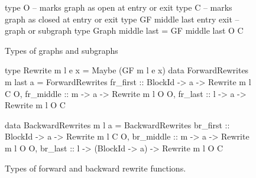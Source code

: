 \documentclass[blockstyle,preprint,natbib,nocopyrightspace]{sigplanconf}
\newcommand\figlabel[1]{\label{fig:#1}}
\begin{document}
\begin{figure}
\begin{code}
type O  -- marks graph as open   at entry or exit
type C  -- marks graph as closed at entry or exit
type GF middle last entry exit -- graph or subgraph
type Graph middle last = GF middle last O C
\end{code}

\caption{Types of graphs and subgraphs}
\figlabel{subgraphs}

\begin{code}
type Rewrite m l e x = Maybe (GF m l e x)
data ForwardRewrites m last a = ForwardRewrites
 {fr_first  :: BlockId -> a -> Rewrite m l C O,
  fr_middle :: m       -> a -> Rewrite m l O O,
  fr_last   :: l       -> a -> Rewrite m l O C} 

data BackwardRewrites m l a = BackwardRewrites
 {br_first  :: BlockId -> a  -> Rewrite m l C O,
  br_middle :: m       -> a  -> Rewrite m l O O,
  br_last   :: l -> (BlockId -> a) -> Rewrite m l O C} 
\end{code}
\caption{Types of forward and backward rewrite functions.}
\figlabel{rewrites}
\label{haskell.def.br:unlast}%
\label{haskell.def.br:unmiddle}%
\label{haskell.def.br:unfirst}%
\label{haskell.def.BackwardRewrites}%
\label{haskell.def.fr:unlast}%
\label{haskell.def.fr:unmiddle}%
\label{haskell.def.fr:unfirst}%
\label{haskell.def.ForwardRewrites}%
\label{haskell.def.Rewrite}%
\label{haskell.def.Graph}%
\label{haskell.def.exit}%
\label{haskell.def.entry}%
\label{haskell.def.GF}%
\label{haskell.def.C}%
\label{haskell.def.O}%
\label{haskell.firstuse.Rewrite}%
\label{haskell.firstuse.e}%
\label{haskell.firstuse.ForwardRewrites}%
\label{haskell.firstuse.fr:unfirst}%
\label{haskell.firstuse.fr:unmiddle}%
\label{haskell.firstuse.fr:unlast}%
\label{haskell.firstuse.BackwardRewrites}%
\label{haskell.firstuse.br:unfirst}%
\label{haskell.firstuse.br:unmiddle}%
\label{haskell.firstuse.br:unlast}%
\label{haskell.firstuse.O}%
\label{haskell.firstuse.C}%
\label{haskell.firstuse.GF}%
\label{haskell.firstuse.middle}%
\label{haskell.firstuse.entry}%
\label{haskell.firstuse.exit}%
\end{figure}
\end{document}
